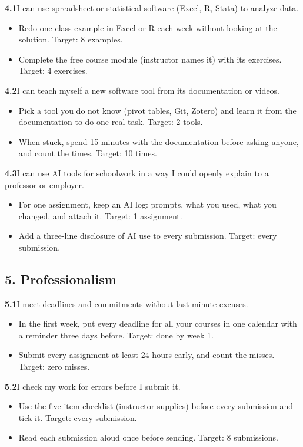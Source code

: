\documentclass[11pt,letterpaper]{article}
\newcommand{\bx}{$\square$}
\newcommand{\itemhead}[2]{\par\vspace{6pt}\noindent\textbf{#1}\quad #2\par\vspace{-4pt}}
\newenvironment{practices}{\begin{itemize}[leftmargin=2.2em,itemsep=1pt,topsep=2pt,label=\bx]}{\end{itemize}}
\begin{document}
\itemhead{4.1}{I can use spreadsheet or statistical software (Excel, R, Stata) to analyze data.}
\begin{practices}
\item Redo one class example in Excel or R each week without looking at the solution. Target: 8 examples.
\item Complete the free course module (instructor names it) with its exercises. Target: 4 exercises.
\end{practices}

\itemhead{4.2}{I can teach myself a new software tool from its documentation or videos.}
\begin{practices}
\item Pick a tool you do not know (pivot tables, Git, Zotero) and learn it from the documentation to do one real task. Target: 2 tools.
\item When stuck, spend 15 minutes with the documentation before asking anyone, and count the times. Target: 10 times.
\end{practices}

\itemhead{4.3}{I can use AI tools for schoolwork in a way I could openly explain to a professor or employer.}
\begin{practices}
\item For one assignment, keep an AI log: prompts, what you used, what you changed, and attach it. Target: 1 assignment.
\item Add a three-line disclosure of AI use to every submission. Target: every submission.
\end{practices}

\subsection*{5. Professionalism}

\itemhead{5.1}{I meet deadlines and commitments without last-minute excuses.}
\begin{practices}
\item In the first week, put every deadline for all your courses in one calendar with a reminder three days before. Target: done by week 1.
\item Submit every assignment at least 24 hours early, and count the misses. Target: zero misses.
\end{practices}

\itemhead{5.2}{I check my work for errors before I submit it.}
\begin{practices}
\item Use the five-item checklist (instructor supplies) before every submission and tick it. Target: every submission.
\item Read each submission aloud once before sending. Target: 8 submissions.
\end{practices}
\end{document}
